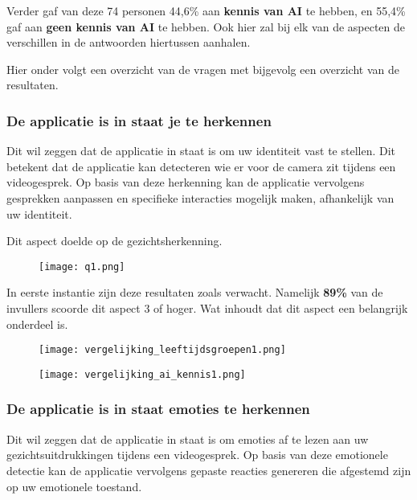 Verder gaf van deze 74 personen 44,6\% aan \textbf{kennis van AI} te hebben, en 55,4\% gaf aan \textbf{geen kennis van AI} te hebben. Ook hier zal bij elk van de aspecten de verschillen in de antwoorden hiertussen aanhalen.

Hier onder volgt een overzicht van de vragen met bijgevolg een overzicht van de resultaten.

\subsubsection{De applicatie is in staat je te herkennen}

Dit wil zeggen dat de applicatie in staat is om uw identiteit vast te stellen. Dit betekent dat de applicatie kan detecteren wie er voor de camera zit tijdens een videogesprek. Op basis van deze herkenning kan de applicatie vervolgens gesprekken aanpassen en specifieke interacties mogelijk maken, afhankelijk van uw identiteit.

Dit aspect doelde op de gezichtsherkenning.

\begin{figure}[htbp]
    \centering
    \texttt{[image: q1.png]}
    \label{fig:vraag_1_resultaat}
\end{figure}

In eerste instantie zijn deze resultaten zoals verwacht. Namelijk \textbf{89\%} van de invullers scoorde dit aspect 3 of hoger. Wat inhoudt dat dit aspect een belangrijk onderdeel is.

\begin{figure}[htbp]
    \centering
    \texttt{[image: vergelijking\_leeftijdsgroepen1.png]}
    \label{fig:vergelijking_leeftijd1}
\end{figure}

\begin{figure}[htbp]
    \centering
    \texttt{[image: vergelijking\_ai\_kennis1.png]}
    \label{fig:vergelijking_ai_kennis1}
\end{figure}

\subsubsection{De applicatie is in staat emoties te herkennen}

Dit wil zeggen  dat de applicatie in staat is om emoties af te lezen aan uw gezichtsuitdrukkingen tijdens een videogesprek. Op basis van deze emotionele detectie kan de applicatie vervolgens gepaste reacties genereren die afgestemd zijn op uw emotionele toestand.

